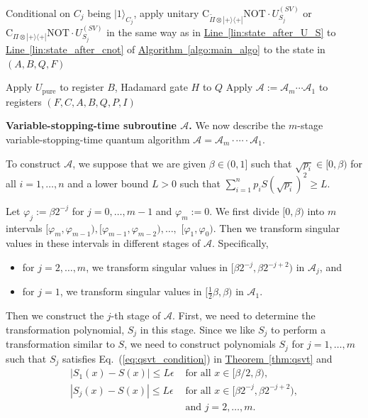 \documentclass[journal]{IEEEtran}
\newcommand{\eq}[1]{Eq.~(\ref{eq:#1})}
\newcommand{\thm}[1]{\hyperref[thm:#1]{Theorem~\ref*{thm:#1}}}
\newcommand{\algo}[1]{\hyperref[algo:#1]{Algorithm~\ref*{algo:#1}}}
\newcommand{\lin}[1]{\hyperref[lin:#1]{Line~\ref*{lin:#1}}}
\begin{document}
\begin{algorithm*}[ht]
{{      Conditional on $C_{j}$ being $|1\rangle_{C_{j}}$, apply unitary $\text{C}_{\widetilde{\Pi }\otimes|+\rangle\langle+|}\text{NOT}\cdot U^{(SV)}_{S_{j}}$ or $\text{C}_{\Pi\otimes|+\rangle\langle+|}\text{NOT}\cdot U^{(SV)}_{S_{j}}$ in the same way as in \lin{state_after_U_S} to \lin{state_after_cnot} of \algo{main_algo} to the state in $(A,B,Q,F)$\;
    }
  }

    Apply $U_{\mathrm{pure}}$ to register $B$, Hadamard gate $H$ to $Q$\;
    Apply $\mathcal{A}:=\mathcal{A}_m\cdots\mathcal{A}_1$ to registers $(F,C,A,B,Q,P,I)$\;
    \caption{A variable-stopping-time subroutine when estimating $\sum_{i=1}^n p_i S(\sqrt{p_i})^2$.}
  \label{algo:improved_main_algo_sub}
\end{algorithm*}
\vspace{3mm}
\noindent
\textbf{Variable-stopping-time subroutine $\mathcal{A}$.}
We now describe the $m$-stage variable-stopping-time quantum algorithm $\mathcal{A}=\mathcal{A}_{m} \cdot \cdots \cdot \mathcal{A}_{1}$.

To construct $\mathcal{A}$, we suppose that we are given $\beta \in (0,1]$ such that $\sqrt{p_i} \in [0,\beta)$ for all $i = 1,\ldots,n$ and a lower bound $L > 0$ such that $\sum_{i = 1}^n p_i S(\sqrt{p_i})^2 \ge L$.

Let $\varphi_{j}:=\beta2^{-j}$ for $j = 0,\ldots,m-1$ and $\varphi_m := 0$. We first divide $[0,\beta)$ into $m$ intervals $[\varphi_m,\varphi_{m-1}),[\varphi_{m-1},\varphi_{m-2}),\ldots,$ $[\varphi_{1},\varphi_0)$. Then we transform singular values in these intervals in different stages of $\mathcal{A}$. Specifically,
\begin{itemize}
    \item for $j = 2,\ldots,m$, we transform singular values in $[\beta 2^{-j},\beta 2^{-j+2})$ in $\mathcal{A}_j$, and
    \item for $j = 1$, we transform singular values in $[\frac{1}{2}\beta,\beta)$ in $\mathcal{A}_1$.
\end{itemize}

Then we construct the $j$-th stage of $\mathcal{A}$. First, we need to determine the transformation polynomial, $S_j$ in this stage. Since we like $S_{j}$ to perform a transformation similar to $S$, we need to construct polynomials $S_{j}$ for $j = 1,\ldots, m$ such that $S_{j}$ satisfies \eq{qsvt_condition} in \thm{qsvt} and
\begin{align}
\label{eq:S_j_condition}
    |S_{1}(x)-S(x)| \le L \epsilon &\text{ for all } x \in [\beta/2,\beta), \nonumber\\
    |S_{j}(x)-S(x)|\le L \epsilon &\text{ for all } x\in[\beta 2^{-j},\beta 2^{-j+2}),\nonumber \\ &\text{ and }j=2,\ldots,m.
\end{align}
\end{document}
